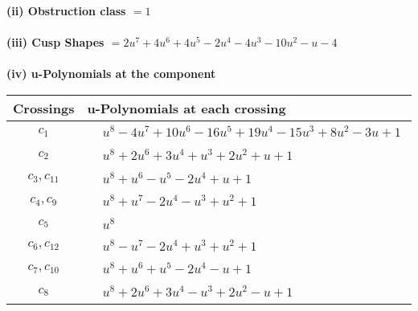 \documentclass[1p]{elsarticle_modified}
\theoremstyle{definition}
\begin{document}
\flushleft \textbf{(ii) Obstruction class $= 1$}\\~\\
\flushleft \textbf{(iii) Cusp Shapes $= 2 u^7+4 u^6+4 u^5-2 u^4-4 u^3-10 u^2- u-4$}\\~\\
\newpage\renewcommand{\arraystretch}{1}
\flushleft \textbf{(iv) u-Polynomials at the component}\newline \\
\begin{tabular}{m{50pt}|m{274pt}}
Crossings & \hspace{64pt}u-Polynomials at each crossing \\
\hline $$\begin{aligned}c_{1}\end{aligned}$$&$\begin{aligned}
&u^8-4 u^7+10 u^6-16 u^5+19 u^4-15 u^3+8 u^2-3 u+1
\end{aligned}$\\
\hline $$\begin{aligned}c_{2}\end{aligned}$$&$\begin{aligned}
&u^8+2 u^6+3 u^4+u^3+2 u^2+u+1
\end{aligned}$\\
\hline $$\begin{aligned}c_{3},c_{11}\end{aligned}$$&$\begin{aligned}
&u^8+u^6- u^5-2 u^4+u+1
\end{aligned}$\\
\hline $$\begin{aligned}c_{4},c_{9}\end{aligned}$$&$\begin{aligned}
&u^8+u^7-2 u^4- u^3+u^2+1
\end{aligned}$\\
\hline $$\begin{aligned}c_{5}\end{aligned}$$&$\begin{aligned}
&u^8
\end{aligned}$\\
\hline $$\begin{aligned}c_{6},c_{12}\end{aligned}$$&$\begin{aligned}
&u^8- u^7-2 u^4+u^3+u^2+1
\end{aligned}$\\
\hline $$\begin{aligned}c_{7},c_{10}\end{aligned}$$&$\begin{aligned}
&u^8+u^6+u^5-2 u^4- u+1
\end{aligned}$\\
\hline $$\begin{aligned}c_{8}\end{aligned}$$&$\begin{aligned}
&u^8+2 u^6+3 u^4- u^3+2 u^2- u+1
\end{aligned}$\\
\hline
\end{tabular}\\~\\
\end{document}
